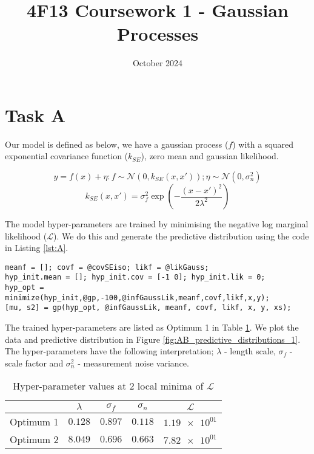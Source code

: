 \documentclass[11pt]{article}
\title{\vspace{-2cm}4F13 Coursework 1 - Gaussian Processes}
\author{}
\date{October 2024}
\newcommand{\Lik}{\mathcal{L}}
\begin{document}
\maketitle
\section{Task A}

Our model is defined as below, we have a gaussian process ($f$) with a squared exponential covariance function ($k_{SE}$), zero mean and gaussian likelihood. 

\[y = f(x) + \eta : f \sim \mathcal{N}(0, k_{SE}(x, x')); \eta \sim \mathcal{N}(0, \sigma_n^2)\]
\[k_{SE}(x,x') = \sigma_f^2 \exp(-\frac{(x-x')^2}{2\lambda^2})\]

The model hyper-parameters are trained by minimising the negative log marginal likelihood ($\Lik$). We do this and generate the predictive distribution using the code in Listing \ref{lst:A}. 

\begin{lstlisting}[caption=Code to train hyper-parameters and generate the predictive distribution of a GP with squared exponential covariance, captionpos=b, basicstyle=\small, frame=tlrb]
meanf = []; covf = @covSEiso; likf = @likGauss; 
hyp_init.mean = []; hyp_init.cov = [-1 0]; hyp_init.lik = 0;
hyp_opt = minimize(hyp_init,@gp,-100,@infGaussLik,meanf,covf,likf,x,y);
[mu, s2] = gp(hyp_opt, @infGaussLik, meanf, covf, likf, x, y, xs);
\end{lstlisting}
\label{lst:A}

The trained hyper-parameters are listed as Optimum 1 in Table \ref{table:AB_hyper_parameters}. We plot the data and predictive distribution in Figure \ref{fig:AB_predictive_distributions_1}. The hyper-parameters have the following interpretation; $\lambda$ - length scale, $\sigma_f$ - scale factor and $\sigma_n^2$ - measurement noise variance.

\begin{table}[h]
    \centering
    \small
    \begin{tabular}{|c|c|c|c|c|}
        \hline
         & $\lambda$ & $\sigma_f$ & $\sigma_n$ & $\Lik$ \\
        \hline
        Optimum 1 & $0.128$ & $0.897$ & $0.118$ & $\num{1.19e+01}$ \\ 
        Optimum 2 & $8.049$ & $0.696$ & $0.663$ & $\num{7.82e+01}$ \\ 
        \hline
    \end{tabular}
    \caption{Hyper-parameter values at 2 local minima of $\Lik$}
    \label{table:AB_hyper_parameters}
\end{table}
\end{document}
